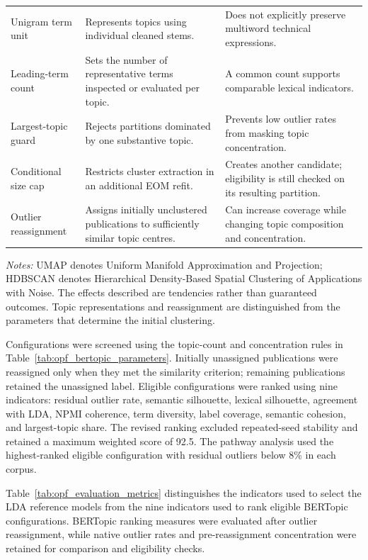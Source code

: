 \documentclass[a4paper,fleqn]{cas-sc}
\begin{document}
\begin{table}[htbp]
\begin{tabularx}{\textwidth}{p{35mm}X p{40mm}}
Unigram term unit & Represents topics using individual cleaned stems. & Does not explicitly preserve multiword technical expressions. \\
Leading-term count & Sets the number of representative terms inspected or evaluated per topic. & A common count supports comparable lexical indicators. \\
Largest-topic guard & Rejects partitions dominated by one substantive topic. & Prevents low outlier rates from masking topic concentration. \\
Conditional size cap & Restricts cluster extraction in an additional EOM refit. & Creates another candidate; eligibility is still checked on its resulting partition. \\
Outlier reassignment & Assigns initially unclustered publications to sufficiently similar topic centres. & Can increase coverage while changing topic composition and concentration. \\
\bottomrule
\end{tabularx}
\vspace{2mm}
\begin{minipage}{\textwidth}
\footnotesize
\textit{Notes:} UMAP denotes Uniform Manifold Approximation and Projection; HDBSCAN denotes Hierarchical Density-Based Spatial Clustering of Applications with Noise. The effects described are tendencies rather than guaranteed outcomes. Topic representations and reassignment are distinguished from the parameters that determine the initial clustering.
\end{minipage}
\end{table}

Configurations were screened using the topic-count and concentration rules in Table~\ref{tab:opf_bertopic_parameters}. Initially unassigned publications were reassigned only when they met the similarity criterion; remaining publications retained the unassigned label. Eligible configurations were ranked using nine indicators: residual outlier rate, semantic silhouette, lexical silhouette, agreement with LDA, NPMI coherence, term diversity, label coverage, semantic cohesion, and largest-topic share. The revised ranking excluded repeated-seed stability and retained a maximum weighted score of 92.5. The pathway analysis used the highest-ranked eligible configuration with residual outliers below 8\% in each corpus.

Table~\ref{tab:opf_evaluation_metrics} distinguishes the indicators used to select the LDA reference models from the nine indicators used to rank eligible BERTopic configurations. BERTopic ranking measures were evaluated after outlier reassignment, while native outlier rates and pre-reassignment concentration were retained for comparison and eligibility checks.
\end{document}
